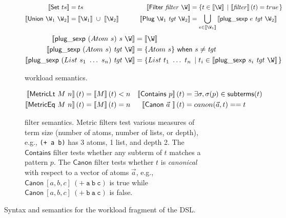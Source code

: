 \begin{figure}
  \begin{subfigure}{\linewidth}
    \begin{align*}
      \denote{ \mathsf{Set} ~ ts } &= ts
      &
      \denote{ \mathsf{Filter} ~ \mathit{filter} ~ \W } &=
      \set{t \in \denote{ \W }}{\denote{ \mathit{filter} } (t) = true}
      \\
      \denote{ \mathsf{Union} ~ \W_1 ~ \W_2 } &=
      \denote{ \W_1 }~\cup~\denote{ \W_2 } \hspace{8mm}
      &
      \denote{ \mathsf{Plug} ~ \W_1 ~ \mathit{tgt} ~ \W_2 } &=
        \bigcup_{e \in \denote{\W_1}}
        \denote{ \plugsexp ~ e ~ \mathit{tgt} ~ \W_2 }
    \end{align*}
    \begin{align*}
      \denote{ \plugsexp ~ (Atom ~ s) ~ \mathit{s} ~ \W } &=
      \denote{ \W }
      \\
      \denote{ \plugsexp ~ (Atom ~ s) ~ \mathit{tgt} ~ \W } &=
      \{Atom ~ s\} ~\mathsf{when} ~ s \neq \mathit{tgt}
      \\
      \denote{ \plugsexp ~ (List ~ s_1 ~ \ldots ~ s_n) ~ \mathit{tgt} ~ \W } &=
      \set{List ~ t_1 ~ \ldots ~ t_n}{t_i \in \denote{ \plugsexp ~ s_i ~ \mathit{tgt} ~ \W }}
    \end{align*}
    \caption{\enumo workload semantics.}
    \label{fig:denote-workload}
  \end{subfigure}

  \begin{subfigure}{\linewidth}
    \begin{align*}
      \left\llbracket \mathsf{MetricLt} ~ M ~ n \right\rrbracket(t) &= \left\llbracket  M  \right\rrbracket (t) < n  &
      \left\llbracket \mathsf{Contains} ~ p \right\rrbracket(t) &=
        \exists \sigma, \sigma(p) \in \mathsf{subterms}(t) \\
      \left\llbracket \mathsf{MetricEq} ~ M ~ n \right\rrbracket(t) &= \left\llbracket  M  \right\rrbracket (t) = n  &
      \left\llbracket \mathsf{Canon} ~ \vec{a} ~  \right\rrbracket(t) &= canon(\vec{a}, t) == t
    \end{align*}
    \caption{
      \enumo filter semantics.
      Metric filters test various measures of term size
        (number of atoms, number of lists, or depth), e.g.,
        \texttt{(+ a b)} has 3 atoms, 1 list, and depth 2.
      The $\mathsf{Contains}$ filter tests whether
        any subterm of $t$ matches a pattern $p$.
      The $\mathsf{Canon}$ filter tests whether
        $t$ is \textit{canonical} with respect to
        a vector of atoms $\vec{a}$, e.g.,
        $\mathsf{Canon} ~ [a, b, c] ~ \mathtt{(+ ~ a ~ b ~ c)}$ is true while
        $\mathsf{Canon} ~ [a, b, c] ~ \mathtt{(+ ~ b ~ a ~ c)}$ is false.
    }\label{fig:denote-filter}
  \end{subfigure}

  \caption{
    Syntax and semantics for the workload fragment of the \enumo DSL.
  }\label{fig:workload}
\end{figure}

